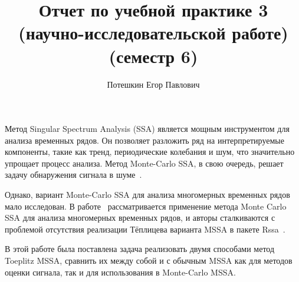 \documentclass[specialist,
substylefile = spbu_report.rtx,
subf,href,colorlinks=true, 12pt]{disser}
\theoremstyle{definition}
\begin{document}
	
	\title{Отчет по учебной практике 3 (научно-исследовательской работе) (семестр 6)}
	
	
	\author{Потешкин Егор Павлович}
	
	
	\date{\number\year}
	
	\maketitle
	\tableofcontents
	\intro
	Метод Singular Spectrum Analysis (SSA) является мощным инструментом для анализа временных рядов. Он позволяет разложить ряд на интерпретируемые компоненты, такие как тренд, периодические колебания и шум, что значительно упрощает процесс анализа. Метод Monte-Carlo SSA, в свою очередь, решает задачу обнаружения сигнала в шуме~\cite{Golyandina_2023}.
	
	Однако, вариант Monte-Carlo SSA для анализа многомерных временных рядов мало исследован. В работе~\cite{Larin_2022} рассматривается применение метода Monte Carlo SSA для анализа многомерных временных рядов, и авторы сталкиваются с проблемой отсутствия реализации Тёплицева варианта MSSA в пакете Rssa~\cite{Rssa}.
	
	В этой работе была поставлена задача реализовать двумя способами метод Toeplitz MSSA, сравнить их между собой и с обычным MSSA как для методов оценки сигнала, так и для использования в Monte-Carlo MSSA.
	
	
	
\end{document}
